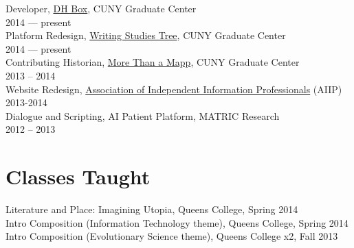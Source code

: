 \documentclass[11pt]{article}
\begin{document}
Developer, \href{http://dhbox.org/}{DH Box}, CUNY Graduate Center\\
2014 — present\\

Platform Redesign, \href{http://www.writingstudiestree.org/}{Writing Studies Tree}, CUNY Graduate Center\\
2014 — present\\

Contributing Historian, \href{http://www.morethanamapp.org/}{More Than a Mapp}, CUNY Graduate Center\\
2013 – 2014\\

Website Redesign, \href{http://www.aiip.org/}{Association of Independent Information Professionals} (AIIP)\\
2013-2014\\

Dialogue and Scripting, AI Patient Platform, MATRIC Research\\
2012 – 2013\\

\section*{Classes Taught}
\label{sec:orgheadline9}

Literature and Place: Imagining Utopia, Queens College, Spring 2014\\
Intro Composition (Information Technology theme), Queens College, Spring 2014\\
Intro Composition (Evolutionary Science theme), Queens College  x2, Fall 2013\\
\end{document}
